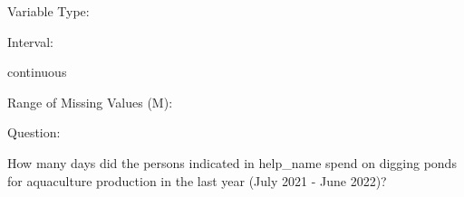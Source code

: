 \documentclass[
]{article}
\begin{document}
\begin{minipage}[t]{0.3\linewidth}

Variable Type:

\end{minipage}%
\begin{minipage}[t]{0.7\linewidth}

\end{minipage}

\begin{minipage}[t]{0.3\linewidth}

Interval:

\end{minipage}%
\begin{minipage}[t]{0.7\linewidth}

continuous

\end{minipage}

\begin{minipage}[t]{0.3\linewidth}

Range of Missing Values (M):

\end{minipage}%
\begin{minipage}[t]{0.7\linewidth}

\end{minipage}

\begin{minipage}[t]{0.3\linewidth}

Question:

\end{minipage}%
\begin{minipage}[t]{0.7\linewidth}

How many days did the persons indicated in help\_name spend on digging
ponds for aquaculture production in the last year (July 2021 - June
2022)?

\end{minipage}

\begin{minipage}[t]{0.3\linewidth}

~

\end{minipage}%
\begin{minipage}[t]{0.7\linewidth}

~

\end{minipage}
 \vspace*{-6mm} 

\begin{minipage}[t]{0.3\linewidth}

~

\end{minipage}%
\begin{minipage}[t]{0.7\linewidth}

~

\end{minipage}
 \vspace*{-4mm} 
\end{document}
